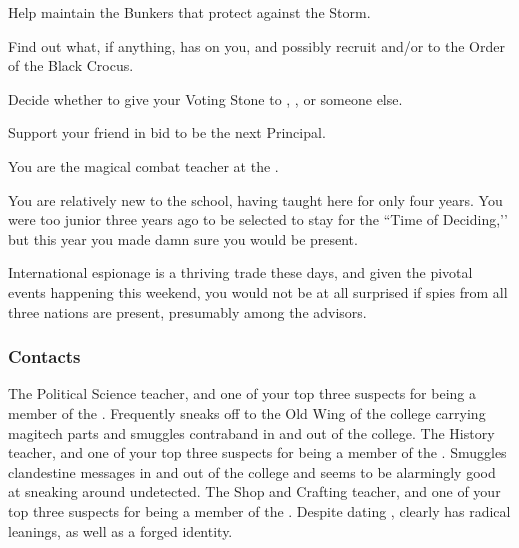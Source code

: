 \documentclass[char]{GL2020}
\begin{document}
\begin{itemz}
    \item Help \cBunker{} maintain the Bunkers that protect against the Storm.
    \item Find out what, if anything, \cLibAssist{} has on you, and possibly recruit \cLibAssist{\them} and/or \cPirateChild{} to the Order of the Black Crocus.
    \item Decide whether to give your Voting Stone to \cAdopted{}, \cDisney{}, or someone else.
    \item Support your friend \cMusic{} in \cMusic{\their} bid to be the next Principal.
\end{itemz}

\begin{itemz}[Notes]
    \item You are the magical combat teacher at the \pSchool{}.
    \item You are relatively new to the school, having taught here for only four years. You were too junior three years ago to be selected to stay for the ``Time of Deciding,’’ but this year you made damn sure you would be present.
    \item International espionage is a thriving trade these days, and given the pivotal events happening this weekend, you would not be at all surprised if spies from all three nations are present, presumably among the advisors.
\end{itemz}

\subsubsection*{Contacts}
\begin{contacts}[Suspects]
    \contact{\cChupInventor{}} The Political Science teacher, and one of your top three suspects for being a member of the \pGoaties{}. Frequently sneaks off to the Old Wing of the college carrying magitech parts and smuggles contraband in and out of the college.
    \contact{\cHistory{}} The History teacher, and one of your top three suspects for being a member of the \pGoaties{}. Smuggles clandestine messages in and out of the college and seems to be alarmingly good at sneaking around undetected.
    \contact{\cPirate{}} The Shop and Crafting teacher, and one of your top three suspects for being a member of the \pGoaties{}. Despite dating \cPrince{\full}, \cPirate{} clearly has radical leanings, as well as a forged identity.
\end{contacts}
\end{document}
